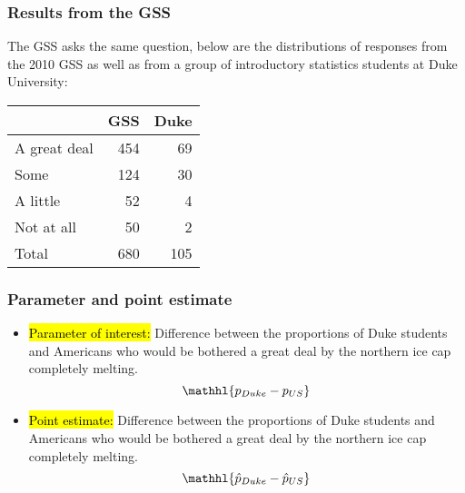 \documentclass[slidestop,compress,mathserif]{beamer}
\begin{document}
\begin{frame}
\frametitle{Results from the GSS}

The GSS asks the same question, below are the distributions of responses from the 2010 GSS as well as from a group of introductory statistics students at Duke University: \\

\begin{center}
\begin{tabular}{l r r}
\hline
				& GSS	& Duke \\
\hline
A great deal		& 454	& 69 \\
Some			& 124 	& 30\\
A little			& 52 		& 4\\
Not at all			& 50 		& 2 \\
\hline
Total				& 680 	& 105\\
\hline
\end{tabular}
\end{center}

\end{frame}


\begin{frame}
\frametitle{Parameter and point estimate}

\begin{itemize}

\item \hl{Parameter of interest:} Difference between the proportions of  Duke students and  Americans who would be bothered a great deal by the northern ice cap completely melting.
\[ \mathhl{ p_{Duke} - p_{US} }\]

\pause

\item \hl{Point estimate:} Difference between the proportions of  Duke students and  Americans who would be bothered a great deal by the northern ice cap completely melting.
\[ \mathhl{ \hat{p}_{Duke} - \hat{p}_{US} }\]

\end{itemize}

\end{frame}

\end{document}
